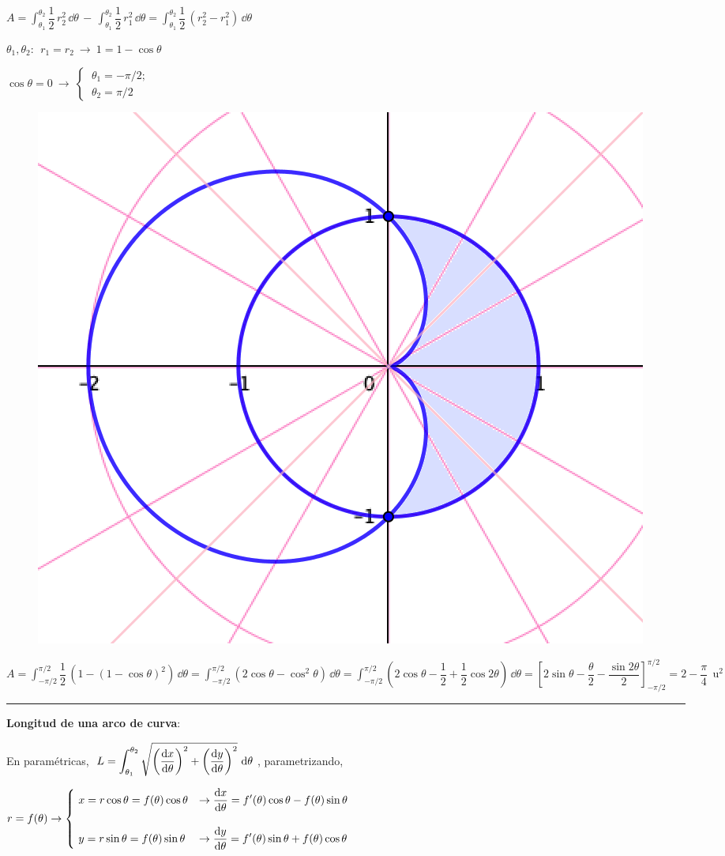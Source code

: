 \begin{multicols}{2}
\small{$A=\displaystyle \int_{\theta_1}^{\theta_2} \dfrac 1 2 \, r_2^2\, \dd \theta \, - \, \displaystyle \int_{\theta_1}^{\theta_2} \dfrac 1 2 \, r_1^2\, \dd \theta=\displaystyle \int_{\theta_1}^{\theta_2} \dfrac 1 2 \, (r_2^2-r_1^2)\, \dd \theta$}

\normalsize{$\theta_1,\theta_2:\ \ r_1=r_2 \ \to \ 1=1-\cos \theta $}

$ \cos \theta = 0 \ \to \ \begin{cases} \  \theta_1=-\pi/2; \\ \ \theta_2=\pi/2 \end{cases}$
\begin{figure}[H]
	\centering
	\includegraphics[width=.25\textwidth]{img-polares/polares33.png}
\end{figure}	
\end{multicols}

$A=\displaystyle \int_{-\pi/2}^{\pi/2} \dfrac 1 2 \, \left( 1-(1-\cos \theta)^2 \right) \, \dd \theta =  \int_{-\pi/2}^{\pi/2} (2\cos \theta - \cos^2 \theta)\, \dd \theta =  \int_{-\pi/2}^{\pi/2} \left( 2\cos \theta - \dfrac 1 2 +\dfrac 1 2 \cos 2\theta \right) \, \dd \theta = \left[ 2\sin \theta - \dfrac \theta 2 -\dfrac{\sin 2\theta}2 \right]_{-\pi/2}^{\pi/2}=2-\dfrac \pi 4 \ \ \mathrm{u}^2$


\begin{flushright}\textcolor{teal}{\rule{250pt}{0.2pt}}	\end{flushright} \vspace{5mm}

\vspace{5mm}

\large{\textbf{Longitud de una arco de curva}}\normalsize{:}

\vspace{5mm}

En paramétricas, $\ L=\displaystyle \int_{\theta_1}^{\theta_2} \sqrt{ \left( \dv{x}{\theta} \right)^2 +    \left( \dv{y}{\theta} \right)^2  } \ \dd \theta \ $,  parametrizando,

$r=f(\theta) \to \begin{cases} 
 \ x=r\cos \theta = f(\theta)\cos \theta & \to \displaystyle \dv{x}{\theta}= f'(\theta)\cos \theta - f(\theta)\sin \theta	 \\ \\ 
 \ y=r\sin \theta = f(\theta)\sin \theta & \to \displaystyle \dv{y}{\theta}= f'(\theta)\sin \theta + f(\theta)\cos \theta
 \end{cases}$
 
